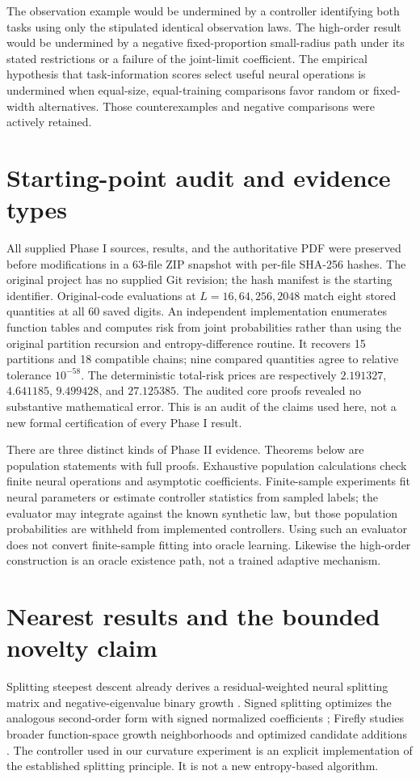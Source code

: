 \documentclass[11pt]{article}
\theoremstyle{remark}\newtheorem{remark}[theorem]{Remark}
\begin{document}
The observation example would be undermined by a controller identifying both
tasks using only the stipulated identical observation laws. The high-order
result would be undermined by a negative fixed-proportion small-radius path
under its stated restrictions or a failure of the joint-limit coefficient.
The empirical hypothesis that task-information scores select useful neural
operations is undermined when equal-size, equal-training comparisons favor
random or fixed-width alternatives. Those counterexamples and negative
comparisons were actively retained.

\section{Starting-point audit and evidence types}
\label{sec:audit}
All supplied Phase I sources, results, and the authoritative PDF were
preserved before modifications in a 63-file ZIP snapshot with per-file
SHA-256 hashes. The original project has no supplied Git revision; the
hash manifest is the starting identifier. Original-code evaluations at
$L=16,64,256,2048$ match eight stored quantities at all 60 saved digits.
An independent implementation enumerates function tables and computes risk
from joint probabilities rather than using the original partition recursion
and entropy-difference routine. It recovers 15 partitions and 18 compatible
chains; nine compared quantities agree to relative tolerance $10^{-58}$.
The deterministic total-risk prices are respectively $2.191327$, $4.641185$,
$9.499428$, and $27.125385$. The audited core proofs revealed no substantive
mathematical error. This is an audit of the claims used here, not a new
formal certification of every Phase I result.

There are three distinct kinds of Phase II evidence. Theorems below are
population statements with full proofs. Exhaustive population calculations
check finite neural operations and asymptotic coefficients. Finite-sample
experiments fit neural parameters or estimate controller statistics from
sampled labels; the evaluator may integrate against the known synthetic law,
but those population probabilities are withheld from implemented controllers.
Using such an evaluator does not convert finite-sample fitting into oracle
learning. Likewise the high-order construction is an oracle existence path,
not a trained adaptive mechanism.

\section{Nearest results and the bounded novelty claim}
\label{sec:related}
Splitting steepest descent already derives a residual-weighted neural
splitting matrix and negative-eigenvalue binary growth
\cite[Sections 2.1--2.3, Theorems 2.2--2.4]{ssd2019}. Signed splitting
optimizes the analogous second-order form with signed normalized coefficients
\cite[Theorems 2.1--2.3]{signed2021}; Firefly studies broader function-space
growth neighborhoods and optimized candidate additions
\cite[Sections 2.1--2.3]{firefly2020}. The controller used in our curvature
experiment is an explicit implementation of the established splitting
principle. It is not a new entropy-based algorithm.
\end{document}
